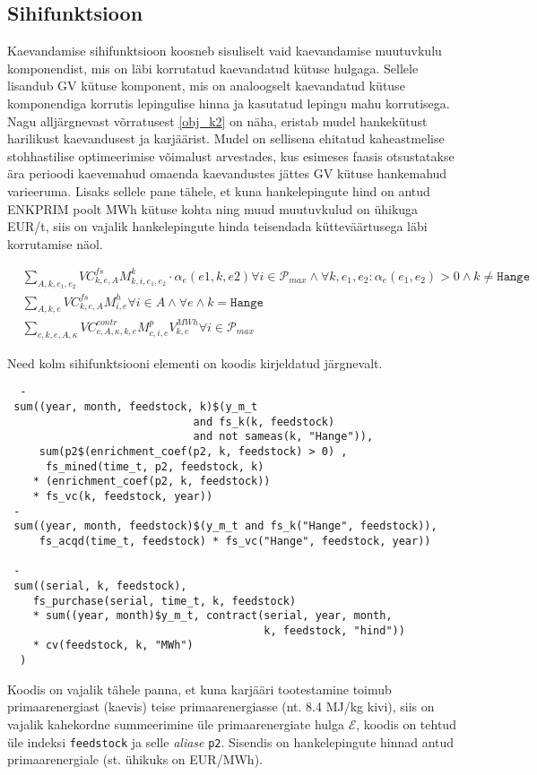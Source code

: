 \documentclass[10pt,a4paper]{article}
\begin{document}
\subsection{Sihifunktsioon}
Kaevandamise sihifunktsioon koosneb sisuliselt vaid kaevandamise muutuvkulu komponendist, mis on läbi korrutatud kaevandatud kütuse hulgaga. Sellele lisandub GV kütuse komponent, mis on analoogselt kaevandatud kütuse komponendiga korrutis lepingulise hinna ja kasutatud lepingu mahu korrutisega. Nagu alljärgnevast võrratusest \ref{obj_k2} on näha, eristab mudel hankekütust harilikust kaevandusest ja karjäärist. Mudel on sellisena ehitatud kaheastmelise stohhastilise optimeerimise võimalust arvestades, kus esimeses faasis otsustatakse ära perioodi kaevemahud omaenda kaevandustes jättes GV kütuse hankemahud varieeruma. Lisaks sellele pane tähele, et kuna hankelepingute hind on antud ENKPRIM poolt MWh kütuse kohta ning muud muutuvkulud on ühikuga EUR/t, siis on vajalik hankelepingute hinda teisendada kütteväärtusega läbi korrutamise näol.

\begin{align}
&\sum_{A,k,e_1,e_2} VC^{fs}_{k, e, A} M^k_{k,i,e_1, e_2} \cdot \alpha_e(e1, k, e2)  \forall i \in \mathcal{P}_{max} \land \forall k, e_1, e_2 : \alpha_e(e_1, e_2)>0 \land k \neq \texttt{Hange} \label{obj_k1} \\
&\sum_{A,k,e} VC^{fs}_{k, e, A} M^h_{i,e}  \forall i \in A \land \forall e \land k = \texttt{Hange} \label{obj_k2}\\
&\sum_{c, k, e, A, \kappa} VC^{contr}_{c, A, \kappa, k, e} M^p_{c,i,e} V^{MWh}_{k,e}  \forall i \in \mathcal{P}_{max} \label{obj_k3}
\end{align}

Need kolm sihifunktsiooni elementi on koodis kirjeldatud järgnevalt.
\begin{verbatim}
  -
 sum((year, month, feedstock, k)$(y_m_t
                             and fs_k(k, feedstock)
                             and not sameas(k, "Hange")),
     sum(p2$(enrichment_coef(p2, k, feedstock) > 0) ,
      fs_mined(time_t, p2, feedstock, k)
    * (enrichment_coef(p2, k, feedstock)) 
    * fs_vc(k, feedstock, year))
 -
 sum((year, month, feedstock)$(y_m_t and fs_k("Hange", feedstock)),
     fs_acqd(time_t, feedstock) * fs_vc("Hange", feedstock, year))

 -
 sum((serial, k, feedstock),
    fs_purchase(serial, time_t, k, feedstock)
    * sum((year, month)$y_m_t, contract(serial, year, month, 
                                        k, feedstock, "hind"))
    * cv(feedstock, k, "MWh")
  )
\end{verbatim}
Koodis on vajalik tähele panna, et kuna karjääri tootestamine toimub primaarenergiast (kaevis) teise primaarenergiasse (nt. 8.4 MJ/kg kivi), siis on vajalik kahekordne summeerimine üle primaarenergiate hulga $\mathcal{E}$, koodis on tehtud üle indeksi \texttt{feedstock} ja selle \emph{aliase} \texttt{p2}. Sisendis on hankelepingute hinnad antud primaarenergiale (st. ühikuks on EUR/MWh).
\end{document}
